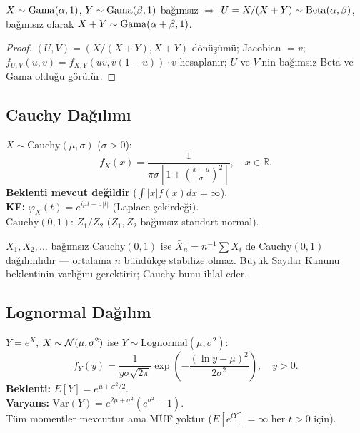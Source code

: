 \begin{onerme}
$X \sim \operatorname{Gama}(\alpha, 1)$, $Y \sim \operatorname{Gama}(\beta, 1)$ bağımsız $\Rightarrow$
$U = X/(X+Y) \sim \operatorname{Beta}(\alpha, \beta)$, bağımsız olarak $X+Y \sim \operatorname{Gama}(\alpha+\beta, 1)$.
\end{onerme}

\begin{proof}
$(U, V) = (X/(X+Y), X+Y)$ dönüşümü; Jacobian $= v$;
$f_{U,V}(u,v) = f_{X,Y}(uv, v(1-u)) \cdot v$ hesaplanır;
$U$ ve $V$'nin bağımsız Beta ve Gama olduğu görülür.
\end{proof}

\subsection{Cauchy Dağılımı}
\label{subsec:cauchy}

\begin{tanim}
\label{def:cauchy}
$X \sim \mathrm{Cauchy}(\mu, \sigma)$ ($\sigma > 0$):
\[
  f_X(x) = \frac{1}{\pi\sigma\left[1 + \left(\frac{x-\mu}{\sigma}\right)^2\right]}, \quad x \in \mathbb{R}.
\]
\textbf{Beklenti mevcut değildir} ($\int |x| f(x) dx = \infty$).\\
\textbf{KF:} $\varphi_X(t) = e^{i\mu t - \sigma|t|}$ (Laplace çekirdeği).\\
$\mathrm{Cauchy}(0,1)$: $Z_1/Z_2$ ($Z_1, Z_2$ bağımsız standart normal).
\end{tanim}

\begin{karsiornek}
$X_1, X_2, \ldots$ bağımsız $\mathrm{Cauchy}(0,1)$ ise
$\bar{X}_n = n^{-1}\sum X_i$ de $\mathrm{Cauchy}(0,1)$ dağılımlıdır ---
ortalama $n$ büüdükçe stabilize olmaz. Büyük Sayılar Kanunu beklentinin
varlığını gerektirir; Cauchy bunu ihlal eder.
\end{karsiornek}

\subsection{Lognormal Dağılım}
\label{subsec:lognormal}

\begin{tanim}
\label{def:lognormal}
$Y = e^X$, $X \sim \mathcal{N}(\mu, \sigma^2)$ ise $Y \sim \mathrm{Lognormal}(\mu, \sigma^2)$:
\[
  f_Y(y) = \frac{1}{y\sigma\sqrt{2\pi}} \exp\!\left(-\frac{(\ln y - \mu)^2}{2\sigma^2}\right), \quad y > 0.
\]
\textbf{Beklenti:} $E[Y] = e^{\mu + \sigma^2/2}$.\\
\textbf{Varyans:} $\mathrm{Var}(Y) = e^{2\mu+\sigma^2}(e^{\sigma^2}-1)$.\\
Tüm momentler mevcuttur ama MÜF yoktur ($E[e^{tY}] = \infty$ her $t > 0$ için).
\end{tanim}

